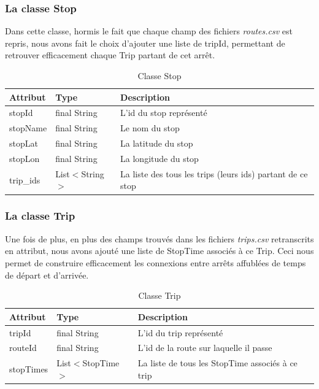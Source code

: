 \documentclass[12pt]{article}
\begin{document}
\subsubsection{La classe Stop}
Dans cette classe, hormis le fait que chaque champ des fichiers \emph{routes.csv} est repris, nous avons fait le choix d'ajouter
une liste de tripId, permettant de retrouver efficacement chaque Trip partant de cet arrêt. 

\begin{table}[h]
    \centering
    \begin{tabular}{|l|l|p{8cm}|}
    \hline
    \textbf{Attribut} & \textbf{Type} & \textbf{Description} \\
    \hline
    stopId & final String & L'id du stop représenté \\
    stopName & final String & Le nom du stop \\
    stopLat & final String & La latitude du stop \\
    stopLon & final String & La longitude du stop \\
    trip\_ids & List$<$String$>$ & La liste des tous les trips (leurs ids) partant de ce stop \\
    \hline
    \end{tabular}
    \caption{Classe Stop}
\end{table}

\subsubsection{La classe Trip}
Une fois de plus, en plus des champs trouvés dans les fichiers \emph{trips.csv} retranscrits en attribut, nous avons ajouté
une liste de StopTime associés à ce Trip. Ceci nous permet de construire efficacement les connexions entre arrêts affublées
de temps de départ et d'arrivée.

\begin{table}[h]
    \centering
    \begin{tabular}{|l|l|p{8cm}|}
    \hline
    \textbf{Attribut} & \textbf{Type} & \textbf{Description} \\
    \hline
    tripId & final String & L'id du trip représenté \\
    routeId & final String & L'id de la route sur laquelle il passe \\
    stopTimes & List$<$StopTime$>$ &  La liste de tous les StopTime associés à ce trip \\
    \hline
    \end{tabular}
    \caption{Classe Trip}
\end{table}
\end{document}

